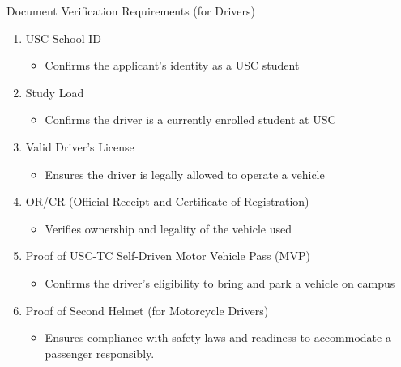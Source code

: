 \vspace{1em}
\indent Document Verification Requirements (for Drivers)
\begin{enumerate}
    \item USC School ID
    \begin{itemize}
        \item Confirms the applicant's identity as a USC student
    \end{itemize}

    \item Study Load
    \begin{itemize}
        \item Confirms the driver is a currently enrolled student at USC
    \end{itemize}
        

    \item Valid Driver’s License  
    \begin{itemize}
        \item Ensures the driver is legally allowed to operate a vehicle
    \end{itemize}
        
    \item OR/CR (Official Receipt and Certificate of Registration)  
    \begin{itemize}
        \item Verifies ownership and legality of the vehicle used
    \end{itemize}
        
    \item Proof of USC-TC Self-Driven Motor Vehicle Pass (MVP)   
    \begin{itemize}
        \item Confirms the driver’s eligibility to bring and park a vehicle on campus
    \end{itemize}

    \item Proof of Second Helmet (for Motorcycle Drivers)   
    \begin{itemize}
        \item Ensures compliance with safety laws and readiness to accommodate a passenger responsibly.
    \end{itemize}
       
\end{enumerate}

